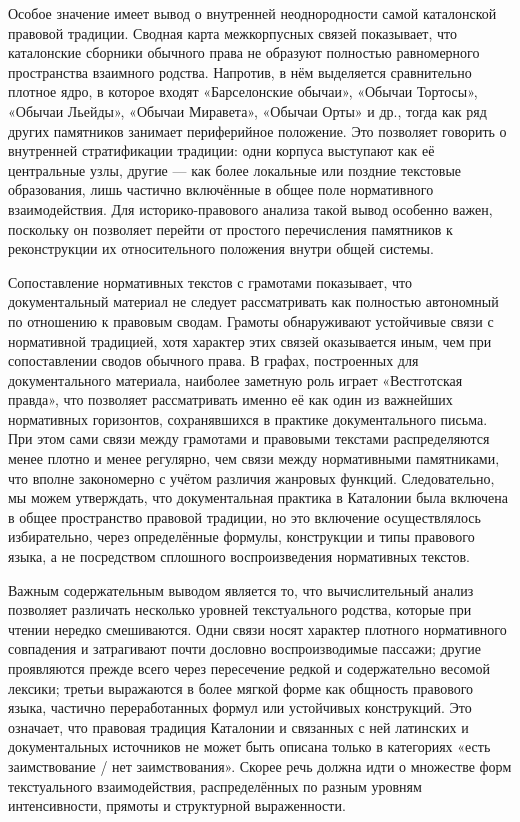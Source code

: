 Особое значение имеет вывод о внутренней неоднородности самой каталонской правовой традиции. Сводная карта межкорпусных связей показывает, что каталонские сборники обычного права не образуют полностью равномерного пространства взаимного родства. Напротив, в нём выделяется сравнительно плотное ядро, в которое входят «Барселонские обычаи», «Обычаи Тортосы», «Обычаи Льейды», «Обычаи Миравета», «Обычаи Орты» и др., тогда как ряд других памятников занимает периферийное положение. Это позволяет говорить о внутренней стратификации традиции: одни корпуса выступают как её центральные узлы, другие --- как более локальные или поздние текстовые образования, лишь частично включённые в общее поле нормативного взаимодействия. Для историко-правового анализа такой вывод особенно важен, поскольку он позволяет перейти от простого перечисления памятников к реконструкции их относительного положения внутри общей системы.

Сопоставление нормативных текстов с грамотами показывает, что документальный материал не следует рассматривать как полностью автономный по отношению к правовым сводам. Грамоты обнаруживают устойчивые связи с нормативной традицией, хотя характер этих связей оказывается иным, чем при сопоставлении сводов обычного права. В графах, построенных для документального материала, наиболее заметную роль играет «Вестготская правда», что позволяет рассматривать именно её как один из важнейших нормативных горизонтов, сохранявшихся в практике документального письма. При этом сами связи между грамотами и правовыми текстами распределяются менее плотно и менее регулярно, чем связи между нормативными памятниками, что вполне закономерно с учётом различия жанровых функций. Следовательно, мы можем утверждать, что документальная практика в Каталонии была включена в общее пространство правовой традиции, но это включение осуществлялось избирательно, через определённые формулы, конструкции и типы правового языка, а не посредством сплошного воспроизведения нормативных текстов.

Важным содержательным выводом является то, что вычислительный анализ позволяет различать несколько уровней текстуального родства, которые при чтении нередко смешиваются. Одни связи носят характер плотного нормативного совпадения и затрагивают почти дословно воспроизводимые пассажи; другие проявляются прежде всего через пересечение редкой и содержательно весомой лексики; третьи выражаются в более мягкой форме как общность правового языка, частично переработанных формул или устойчивых конструкций. Это означает, что правовая традиция Каталонии и связанных с ней латинских и документальных источников не может быть описана только в категориях «есть заимствование / нет заимствования». Скорее речь должна идти о множестве форм текстуального взаимодействия, распределённых по разным уровням интенсивности, прямоты и структурной выраженности.


